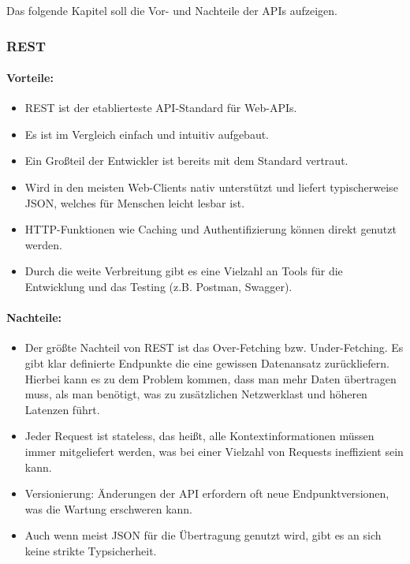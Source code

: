 Das folgende Kapitel soll die Vor- und Nachteile der APIs aufzeigen.

\subsubsection{REST}

\paragraph{Vorteile:}
\begin{itemize}
	\item REST ist der etablierteste API-Standard für Web-APIs.
	\item Es ist im Vergleich einfach und intuitiv aufgebaut.
	\item Ein Großteil der Entwickler ist bereits mit dem Standard vertraut.
	\item Wird in den meisten Web-Clients nativ unterstützt und liefert typischerweise JSON, welches für Menschen leicht lesbar ist.
	\item HTTP-Funktionen wie Caching und Authentifizierung können direkt genutzt werden.
	\item Durch die weite Verbreitung gibt es eine Vielzahl an Tools für die Entwicklung und das Testing (z.B. Postman, Swagger).
\end{itemize}

\paragraph{Nachteile:}
\begin{itemize}
	\item Der größte Nachteil von REST ist das Over-Fetching bzw. Under-Fetching. Es gibt klar definierte Endpunkte die eine gewissen Datenansatz zurückliefern. Hierbei kann es zu dem Problem kommen, dass man mehr Daten übertragen muss, als man benötigt, was zu zusätzlichen Netzwerklast und höheren Latenzen führt.
	\item Jeder Request ist stateless, das heißt, alle Kontextinformationen müssen immer mitgeliefert werden, was bei einer Vielzahl von Requests ineffizient sein kann.
	\item Versionierung: Änderungen der API erfordern oft neue Endpunktversionen, was die Wartung erschweren kann.
	\item Auch wenn meist JSON für die Übertragung genutzt wird, gibt es an sich keine strikte Typsicherheit. 
\end{itemize}

